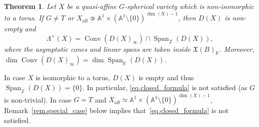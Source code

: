 \documentclass[JEP,XML,SOM,Unicode]{cedram}
\theoremstyle{plain}
\newtheorem{theorem}{Theorem}[section]
\theoremstyle{definition}
\DeclareMathOperator{\aff}{aff}
\DeclareMathOperator{\Conv}{Conv}
\DeclareMathOperator{\Span}{Span}
\newcommand{\RR}{\mathbb{R}}
\newcommand{\ZZ}{\mathbb{Z}}
\renewcommand{\AA}{\mathbb{A}}
\begin{document}
\begin{theorem}
\label{thm.description_of_weight-monoid}
Let $X$ be a quasi-affine $G$-spherical variety which is non-isomorphic to a torus.
If $G \neq T$ or $X_{\aff} \not\simeq \AA^1 \times (\AA^1 \setminus \{0\})^{\dim(X)-1}$, then
$D(X)$ is non-empty and
\[
\label{eq.closed_formula}
\tag{$\varocircle$}
\Lambda^+(X) = \Conv ( D(X)_{\infty}) \cap \Span_{\ZZ}(D(X)),
\]
where the asymptotic cones and linear spans are taken inside $\mathfrak{X}(B)_{\RR}$.
Moreover, $\dim \Conv ( D(X)_{\infty}) = \dim \Span_{\RR}(D(X))$.
\end{theorem}

In case $X$ is isomorphic to a torus, $D(X)$ is empty and thus $\Span_{\ZZ}(D(X)) = \{0\}$.
In particular, \eqref{eq.closed_formula} is not satisfied (as $G$ is non-trivial).
In case $G = T$ and $X_{\aff} \simeq \AA^1 \times (\AA^1 \setminus \{0\})^{\dim(X)-1}$, Remark~\ref{rem.special_case} below implies that~\eqref{eq.closed_formula} is not satisfied.
\end{document}
